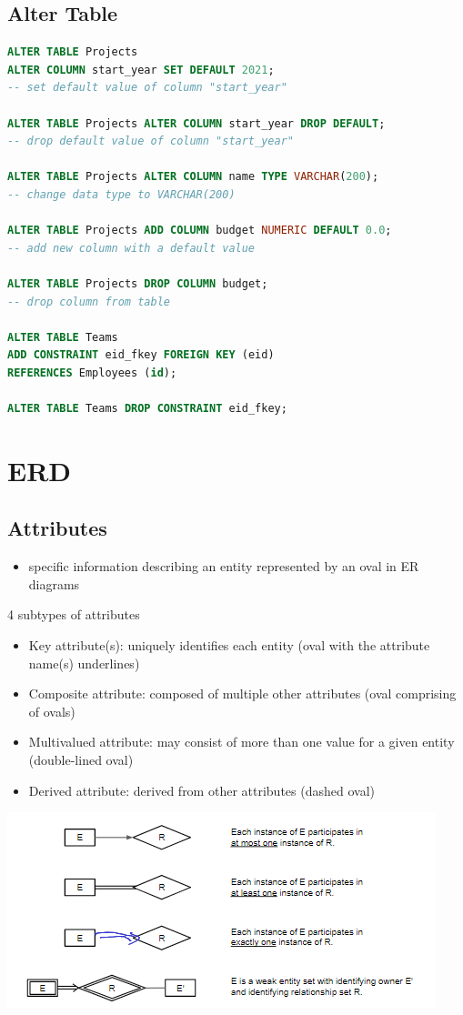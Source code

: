 \documentclass{article}
\begin{document}
\begin{multicols*}{2}
    \subsection*{Alter Table}
    \begin{lstlisting}[language=SQL]
ALTER TABLE Projects 
ALTER COLUMN start_year SET DEFAULT 2021; 
-- set default value of column "start_year"

ALTER TABLE Projects ALTER COLUMN start_year DROP DEFAULT;
-- drop default value of column "start_year"

ALTER TABLE Projects ALTER COLUMN name TYPE VARCHAR(200); 
-- change data type to VARCHAR(200)

ALTER TABLE Projects ADD COLUMN budget NUMERIC DEFAULT 0.0; 
-- add new column with a default value

ALTER TABLE Projects DROP COLUMN budget; 
-- drop column from table

ALTER TABLE Teams 
ADD CONSTRAINT eid_fkey FOREIGN KEY (eid)
REFERENCES Employees (id);

ALTER TABLE Teams DROP CONSTRAINT eid_fkey;
    \end{lstlisting}
    \section*{ERD}
    \subsection*{Attributes}
    \begin{itemize}
        \item specific information describing an entity
              represented by an oval in ER diagrams
    \end{itemize}
    4 subtypes of attributes
    \begin{itemize}
        \item Key attribute(s): uniquely identifies each entity (oval with the attribute name(s) underlines)
        \item Composite attribute: composed of multiple
              other attributes (oval comprising of ovals)
        \item Multivalued attribute: may consist of more
              than one value for a given entity (double-lined oval)
        \item Derived attribute: derived from other attributes
              (dashed oval)
    \end{itemize}
    \includegraphics[scale=0.5]{summary_of_participation_constraints.png}

\end{multicols*}
\end{document}

